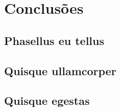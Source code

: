 \chapter{Conclusões}

	\section{Phasellus eu tellus}

		\lipsum[4]

	\section{Quisque ullamcorper}

		\lipsum[2]

	\section{Quisque egestas}

		\lipsum[1]